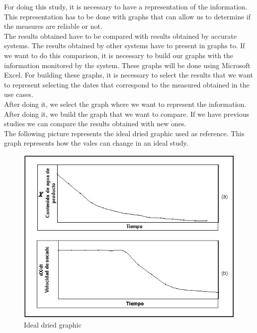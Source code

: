 For doing this study, it is necessary to have a representation of the information. This representation has to be done with graphs that can allow us to determine if the measures are reliable or not.\\

The results obtained have to be compared with results obtained by accurate systems. The results obtained by other systems have to present in graphs to. If we want to do this comparison, it is necessary to build our graphs with the information monitored by the system. These graphs will be done using Microsoft Excel. For building these graphs, it is necessary to select the results that we want to represent selecting the dates that correspond to the measured obtained in the use cases.\\

After doing it, we select the graph where we want to represent the information. After doing it, we build the graph that we want to compare. If we have previous studies we can compare the results obtained with new ones.\\

The following picture represents the ideal dried graphic used as reference. This graph represents how the vales can change in an ideal study.

\begin{figure}[H]
\begin{centering}
\includegraphics[scale=0.6]{IMGS/secado_ideal.jpg}
\caption{Ideal dried graphic \label{Ideal dried graphic}}
\end{centering}
\end{figure}

